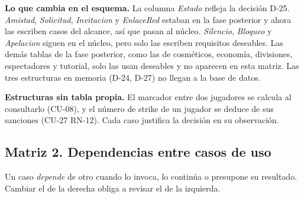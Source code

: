 \textbf{Lo que cambia en el esquema.} La columna \textit{Estado} refleja la decisión \mbox{D-25}. \textit{Amistad}, \textit{Solicitud}, \textit{Invitacion} y \textit{EnlaceRed} estaban en la fase posterior y ahora las escriben casos del alcance, así que pasan al núcleo. \textit{Silencio}, \textit{Bloqueo} y \textit{Apelacion} siguen en el núcleo, pero solo las escriben requisitos deseables. Las demás tablas de la fase posterior, como las de cosméticos, economía, divisiones, espectadores y tutorial, solo las usan deseables y no aparecen en esta matriz. Las tres estructuras en memoria (\mbox{D-24}, \mbox{D-27}) no llegan a la base de datos.

\textbf{Estructuras sin tabla propia.} El marcador entre dos jugadores se calcula al consultarlo (\mbox{CU-08}), y el número de strike de un jugador se deduce de sus sanciones (\mbox{CU-27} \mbox{RN-12}). Cada caso justifica la decisión en su observación.

\subsection*{Matriz 2. Dependencias entre casos de uso}
Un caso \textit{depende} de otro cuando lo invoca, lo continúa o presupone su resultado. Cambiar el de la derecha obliga a revisar el de la izquierda.

